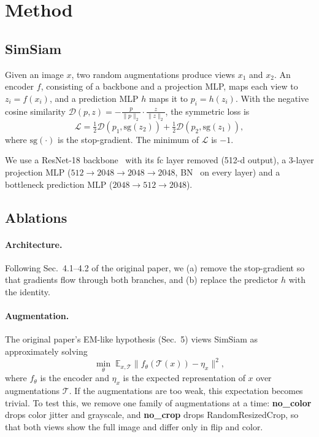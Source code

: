 \documentclass[10pt,twocolumn,letterpaper]{article}
\begin{document}
\section{Method}
\label{sec:method}

\subsection{SimSiam}
Given an image $x$, two random augmentations produce views $x_1$ and $x_2$.
An encoder $f$, consisting of a backbone and a projection MLP, maps each view to $z_i=f(x_i)$, and a prediction MLP $h$ maps it to $p_i=h(z_i)$.
With the negative cosine similarity $\mathcal{D}(p,z)=-\frac{p}{\|p\|_2}\cdot\frac{z}{\|z\|_2}$, the symmetric loss is
\begin{equation}
\mathcal{L}=\tfrac12\mathcal{D}(p_1,\text{sg}(z_2))+\tfrac12\mathcal{D}(p_2,\text{sg}(z_1)),
\label{eq:loss}
\end{equation}
where $\text{sg}(\cdot)$ is the stop-gradient. The minimum of $\mathcal{L}$ is $-1$.

We use a ResNet-18 backbone~\cite{he2016resnet} with its fc layer removed (512-d output), a 3-layer projection MLP ($512\!\to\!2048\!\to\!2048\!\to\!2048$, BN~\cite{ioffe2015bn} on every layer) and a bottleneck prediction MLP ($2048\!\to\!512\!\to\!2048$).

\subsection{Ablations}
\paragraph{Architecture.}
Following Sec.~4.1--4.2 of the original paper, we (a) remove the stop-gradient so that gradients flow through both branches, and (b) replace the predictor $h$ with the identity.

\paragraph{Augmentation.}
The original paper's EM-like hypothesis (Sec.~5) views SimSiam as approximately solving
\begin{equation}
\min_\theta\; \mathbb{E}_{x,\mathcal{T}}\bigl\|f_\theta(\mathcal{T}(x))-\eta_x\bigr\|^2,
\label{eq:em}
\end{equation}
where $f_\theta$ is the encoder and $\eta_x$ is the expected representation of $x$ over augmentations $\mathcal{T}$.
If the augmentations are too weak, this expectation becomes trivial.
To test this, we remove one family of augmentations at a time:
\textbf{no\_color} drops color jitter and grayscale, and \textbf{no\_crop} drops RandomResizedCrop, so that both views show the full image and differ only in flip and color.
\end{document}
